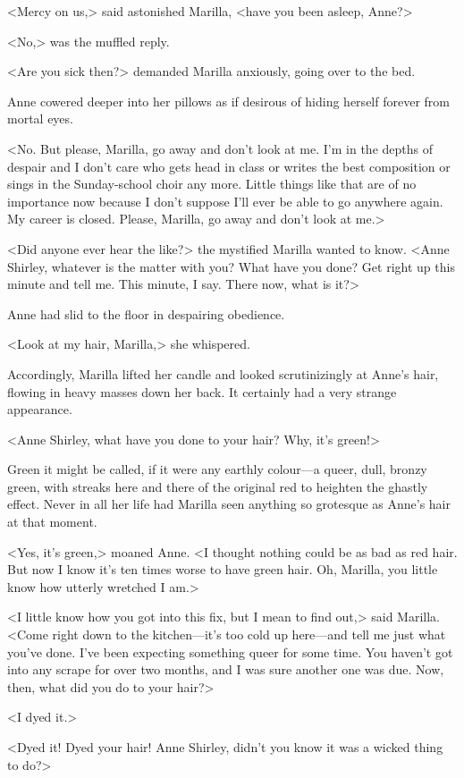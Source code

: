 <Mercy on us,> said astonished Marilla, <have you been asleep, Anne?>

<No,> was the muffled reply.

<Are you sick then?> demanded Marilla anxiously, going over to the bed.

Anne cowered deeper into her pillows as if desirous of hiding herself forever from mortal eyes.

<No. But please, Marilla, go away and don't look at me. I'm in the depths of despair and I don't care who gets head in class or writes the best composition or sings in the Sunday-school choir any more. Little things like that are of no importance now because I don't suppose I'll ever be able to go anywhere again. My career is closed. Please, Marilla, go away and don't look at me.>

<Did anyone ever hear the like?> the mystified Marilla wanted to know. <Anne Shirley, whatever is the matter with you? What have you done? Get right up this minute and tell me. This minute, I say. There now, what is it?>

Anne had slid to the floor in despairing obedience.

<Look at my hair, Marilla,> she whispered.

Accordingly, Marilla lifted her candle and looked scrutinizingly at Anne's hair, flowing in heavy masses down her back. It certainly had a very strange appearance.

<Anne Shirley, what have you done to your hair? Why, it's green!>

Green it might be called, if it were any earthly colour—a queer, dull, bronzy green, with streaks here and there of the original red to heighten the ghastly effect. Never in all her life had Marilla seen anything so grotesque as Anne's hair at that moment.

<Yes, it's green,> moaned Anne. <I thought nothing could be as bad as red hair. But now I know it's ten times worse to have green hair. Oh, Marilla, you little know how utterly wretched I am.>

<I little know how you got into this fix, but I mean to find out,> said Marilla. <Come right down to the kitchen—it's too cold up here—and tell me just what you've done. I've been expecting something queer for some time. You haven't got into any scrape for over two months, and I was sure another one was due. Now, then, what did you do to your hair?>

<I dyed it.>

<Dyed it! Dyed your hair! Anne Shirley, didn't you know it was a wicked thing to do?>


